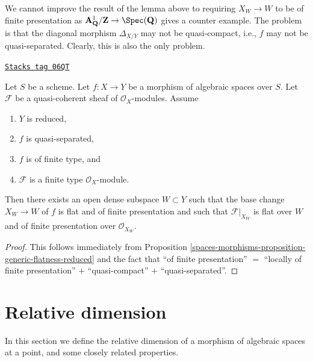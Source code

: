 We cannot improve the result of the lemma above to requiring
$X_W \to W$ to be of finite presentation as
$\mathbf{A}^1_{\mathbf{Q}}/\mathbf{Z} \to \Spec(\mathbf{Q})$
gives a counter example. The problem is that the diagonal morphism
$\Delta_{X/Y}$ may not be quasi-compact, i.e., $f$ may not be
quasi-separated. Clearly, this is also the only problem.

\begin{proposition}
\label{spaces-morphisms-proposition-generic-flatness-reduced-quasi-separated}
\href{https://stacks.math.columbia.edu/tag/06QT}{\texttt{Stacks tag 06QT}}

Let $S$ be a scheme.
Let $f : X \to Y$ be a morphism of algebraic spaces over $S$.
Let $\mathcal{F}$ be a quasi-coherent sheaf of $\mathcal{O}_X$-modules.
Assume
\begin{enumerate}
\item $Y$ is reduced,
\item $f$ is quasi-separated,
\item $f$ is of finite type, and
\item $\mathcal{F}$ is a finite type $\mathcal{O}_X$-module.
\end{enumerate}
Then there exists an open dense subspace $W \subset Y$ such that
the base change $X_W \to W$ of $f$ is flat and of finite presentation
and such that $\mathcal{F}|_{X_W}$ is flat over $W$ and of
finite presentation over $\mathcal{O}_{X_W}$.
\end{proposition}

\begin{proof}
This follows immediately from
Proposition \ref{spaces-morphisms-proposition-generic-flatness-reduced}
and the fact that ``of finite presentation'' $=$
``locally of finite presentation'' $+$ ``quasi-compact'' $+$
``quasi-separated''.
\end{proof}

\section{Relative dimension}
\label{spaces-morphisms-section-relative-dimension}
In this section we define the relative dimension
of a morphism of algebraic spaces at a point, and some closely
related properties.

